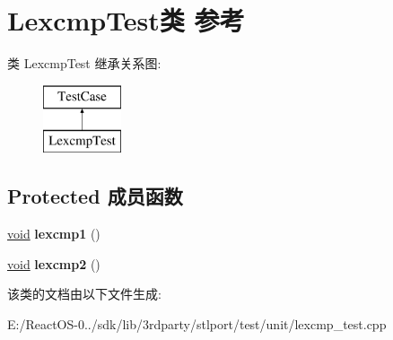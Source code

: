 \hypertarget{class_lexcmp_test}{}\section{Lexcmp\+Test类 参考}
\label{class_lexcmp_test}
类 Lexcmp\+Test 继承关系图\+:\begin{figure}[H]
\begin{center}
\leavevmode
\includegraphics[height=2.000000cm]{class_lexcmp_test}
\end{center}
\end{figure}
\subsection*{Protected 成员函数}
\begin{DoxyCompactItemize}
\item 
\mbox{\label{class_lexcmp_test_a2743a4d2e59176ff755a950c36b9763a}} 
\hyperlink{interfacevoid}{void} {\bfseries lexcmp1} ()
\item 
\mbox{\label{class_lexcmp_test_a62ff7bfe725ce7cfab0c74a92758a128}} 
\hyperlink{interfacevoid}{void} {\bfseries lexcmp2} ()
\end{DoxyCompactItemize}


该类的文档由以下文件生成\+:\begin{DoxyCompactItemize}
\item 
E\+:/\+React\+O\+S-\/0../sdk/lib/3rdparty/stlport/test/unit/lexcmp\+\_\+test.\+cpp\end{DoxyCompactItemize}
